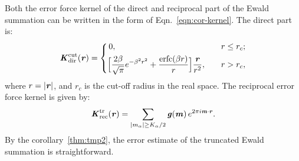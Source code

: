 \documentclass[aps,pre,preprint]{revtex4}
\renewcommand{\v}[1]{\textbf{\textit{#1}}}
\begin{document}
Both the error force kernel of the direct and reciprocal
part of the Ewald summation can be
written in the form of Eqn.~\eqref{eqn:cor-kernel}.  The direct
part is:
\begin{align}
  \v K^{\textrm{cut}}_{\textrm{dir}}(\v r) =
  \left\{
    \begin{aligned}
      &\,0, &\quad & r \leq r_c;\\
      &
      \Big[
      \frac{2\beta}{\sqrt\pi} e^{-\beta^2r^2} + \frac{\textrm{erfc}(\beta r)}{r}
      \Big]\frac{\v r}{r^2}
      ,& & r > r_c,
    \end{aligned}
  \right.
\end{align}
where $r = \vert\v r\vert$, and $r_c$ is the cut-off radius in the
real space.
The reciprocal error force kernel is given by:
\begin{align}
  \v K^{\textrm{tr}}_{\textrm{rec}}(\v r) =
  \sum_{
      \vert m_\alpha\vert \geq K_\alpha/2}
  \v g(\v m) \,
  e^{2\pi i\v m\cdot\v r}.
\end{align}
By the corollary~\ref{thm:tmp2}, the error estimate of the
truncated Ewald summation is straightforward.


\end{document}
